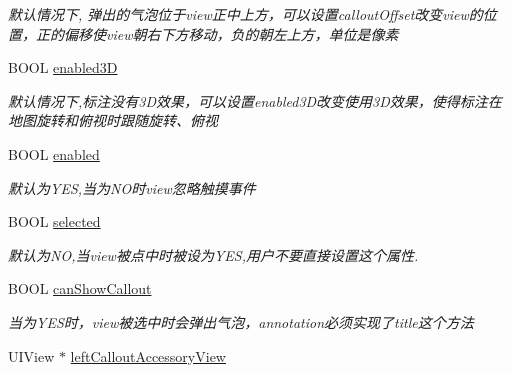\begin{DoxyCompactItemize}
\begin{DoxyCompactList}\small\item\em 默认情况下, 弹出的气泡位于view正中上方，可以设置callout\-Offset改变view的位置，正的偏移使view朝右下方移动，负的朝左上方，单位是像素 \end{DoxyCompactList}\item 
\hypertarget{interface_b_m_k_annotation_view_a18cef771d9b9feeb74a4bc4dd7fba526}{B\-O\-O\-L \hyperlink{interface_b_m_k_annotation_view_a18cef771d9b9feeb74a4bc4dd7fba526}{enabled3\-D}}\label{interface_b_m_k_annotation_view_a18cef771d9b9feeb74a4bc4dd7fba526}

\begin{DoxyCompactList}\small\item\em 默认情况下,标注没有3\-D效果，可以设置enabled3\-D改变使用3\-D效果，使得标注在地图旋转和俯视时跟随旋转、俯视 \end{DoxyCompactList}\item 
\hypertarget{interface_b_m_k_annotation_view_ad768885a75146458b4efd168885478fe}{B\-O\-O\-L \hyperlink{interface_b_m_k_annotation_view_ad768885a75146458b4efd168885478fe}{enabled}}\label{interface_b_m_k_annotation_view_ad768885a75146458b4efd168885478fe}

\begin{DoxyCompactList}\small\item\em 默认为\-Y\-E\-S,当为\-N\-O时view忽略触摸事件 \end{DoxyCompactList}\item 
\hypertarget{interface_b_m_k_annotation_view_a09799664ef861651bd7996f0fbab6483}{B\-O\-O\-L \hyperlink{interface_b_m_k_annotation_view_a09799664ef861651bd7996f0fbab6483}{selected}}\label{interface_b_m_k_annotation_view_a09799664ef861651bd7996f0fbab6483}

\begin{DoxyCompactList}\small\item\em 默认为\-N\-O,当view被点中时被设为\-Y\-E\-S,用户不要直接设置这个属性. \end{DoxyCompactList}\item 
\hypertarget{interface_b_m_k_annotation_view_adef94e946f5b152c59be1cdb5eccfb74}{B\-O\-O\-L \hyperlink{interface_b_m_k_annotation_view_adef94e946f5b152c59be1cdb5eccfb74}{can\-Show\-Callout}}\label{interface_b_m_k_annotation_view_adef94e946f5b152c59be1cdb5eccfb74}

\begin{DoxyCompactList}\small\item\em 当为\-Y\-E\-S时，view被选中时会弹出气泡，annotation必须实现了title这个方法 \end{DoxyCompactList}\item 
\hypertarget{interface_b_m_k_annotation_view_ae182c0fb7dc1898c4941a123def7f926}{U\-I\-View $\ast$ \hyperlink{interface_b_m_k_annotation_view_ae182c0fb7dc1898c4941a123def7f926}{left\-Callout\-Accessory\-View}}\label{interface_b_m_k_annotation_view_ae182c0fb7dc1898c4941a123def7f926}


\end{DoxyCompactItemize}
